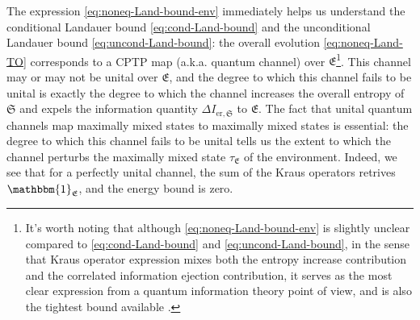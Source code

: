 \documentclass[preprints,article,accept,moreauthors,pdftex]{Definitions/mdpi}
\begin{document}
\begin{paracol}{2}
The expression \eqref{eq:noneq-Land-bound-env} immediately helps us understand the conditional Landauer bound \eqref{eq:cond-Land-bound} and the unconditional Landauer bound \eqref{eq:uncond-Land-bound}: the overall evolution \eqref{eq:noneq-Land-TO} corresponds to a CPTP map (a.k.a. quantum channel) over $\mathfrak{E}$\footnote{It's worth noting that although \eqref{eq:noneq-Land-bound-env} is slightly unclear compared to \eqref{eq:cond-Land-bound} and \eqref{eq:uncond-Land-bound}, in the sense that Kraus operator expression mixes both the entropy increase contribution and the correlated information ejection contribution, it serves as the most clear expression from a quantum information theory point of view, and is also the tightest bound available \cite{Goold15}.}. This channel may or may not be unital over $\mathfrak{E}$, and the degree to which this channel fails to be unital is exactly the degree to which the channel increases the overall entropy of $\mathfrak{S}$ and expels the information quantity $\Delta I_{\mathrm{er},\mathfrak{S}}$ to $\mathfrak{E}$. The fact that unital quantum channels map maximally mixed states to maximally mixed states is essential: the degree to which this channel fails to be unital tells us the extent to which the channel perturbs the maximally mixed state $\tau_{\mathfrak{E}}$ of the environment. Indeed, we see that for a perfectly unital channel, the sum of the Kraus operators retrives $\mathbbm{1}_{\mathfrak{E}}$, and the energy bound is zero.


\end{paracol}
\end{document}

